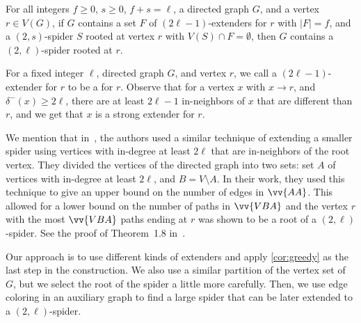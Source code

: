 \documentclass[a4paper,USenglish,cleveref,autoref,thm-restate,pdfa]{lipics-v2021}
\let\ge\geqslant
\newcommand{\norm}[1]{{\left|#1\right|}}
\newcommand{\pathset}[1]{\vv{#1}}
\let\emph\relax\DeclareTextFontCommand{\emph}{\color{dark blue}\em}
\begin{document}
\begin{corollary}\label{cor:greedy}
    For all integers $f \ge 0$, $s \ge 0$, $f+s=\ell$, a directed graph $G$, and a vertex $r \in V(G)$, if $G$ contains a set $F$ of $(2\ell-1)$-extenders for $r$ with $\norm{F}=f$, and a $(2,s)$\nobreakdash-spider $S$ rooted at vertex $r$ with $V(S) \cap F = \emptyset$, then $G$ contains a $(2,\ell)$\nobreakdash-spider rooted at $r$.
\end{corollary}
For a fixed integer $\ell$, directed graph $G$, and vertex $r$, we call a $(2\ell-1)$-extender for $r$ to be a \emph{strong extender} for $r$.
Observe that for a vertex $x$ with $x\to r$, and $\delta^-(x) \ge 2\ell$, there are at least $2\ell-1$ in-neighbors of $x$ that are different than $r$, and we get that $x$ is a strong extender for $r$.

We mention that in~\cite{hons2025unavoidable}, the authors used a similar technique of extending a smaller spider using vertices with in-degree at least $2\ell$ that are in-neighbors of the root vertex.
They divided the vertices of the directed graph into two sets: set $A$ of vertices with in-degree at least $2\ell$, and $B=V\setminus A$.
In their work, they used this technique to give an upper bound on the number of edges in $\pathset{AA}$.
This allowed for a lower bound on the number of paths in $\pathset{VBA}$ and the vertex $r$ with the most $\pathset{VBA}$ paths ending at $r$ was shown to be a root of a $(2,\ell)$\nobreakdash-spider.
See the proof of Theorem~1.8 in~\cite{hons2025unavoidable}.

Our approach is to use different kinds of extenders and apply \cref{cor:greedy} as the last step in the construction.
We also use a similar partition of the vertex set of $G$, but we select the root of the spider a little more carefully.
Then, we use edge coloring in an auxiliary graph to find a large spider that can be later extended to a $(2,\ell)$\nobreakdash-spider.
\end{document}
